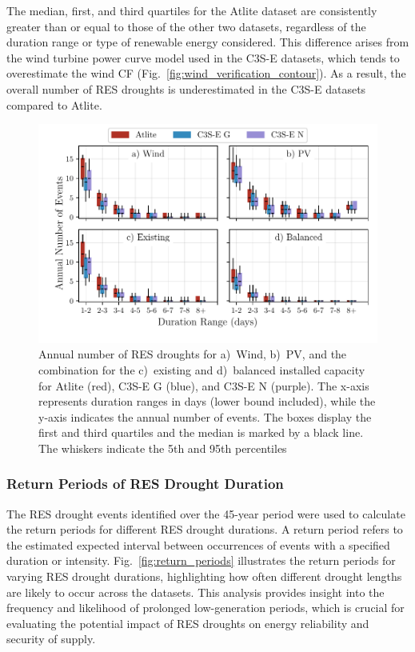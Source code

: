 \documentclass[a4paper, 11p1t]{article}
\begin{document}
The median, first, and third quartiles for the Atlite dataset are consistently greater than or equal to those of the other two datasets, regardless of the duration range or type of renewable energy considered. This difference arises from the wind turbine power curve model used in the C3S-E datasets, which tends to overestimate the wind CF (Fig.~\ref{fig:wind_verification_contour}). As a result, the overall number of RES droughts is underestimated in the C3S-E datasets compared to Atlite. 

\begin{figure}[!ht]
	\centering
	\includegraphics{droughts_number_events.pdf}
	\caption{Annual number of RES droughts for a)~Wind, b)~PV, and the combination for the c)~existing and d)~balanced installed capacity for Atlite (red), C3S-E G (blue), and C3S-E N (purple). The x-axis represents duration ranges in days (lower bound included), while the y-axis indicates the annual number of events. The boxes display the first and third quartiles and the median is marked by a black line. The whiskers indicate the 5th and 95th percentiles}
	\label{fig:boxplot_number_events}	
\end{figure}

\newpage
\subsubsection{Return Periods of RES Drought Duration}

The RES drought events identified over the 45-year period were used to calculate the return periods for different RES drought durations. A return period refers to the estimated expected interval between occurrences of events with a specified duration or intensity. Fig.~\ref{fig:return_periods} illustrates the return periods for varying RES drought durations, highlighting how often different drought lengths are likely to occur across the datasets. This analysis provides insight into the frequency and likelihood of prolonged low-generation periods, which is crucial for evaluating the potential impact of RES droughts on energy reliability and security of supply.
\end{document}
